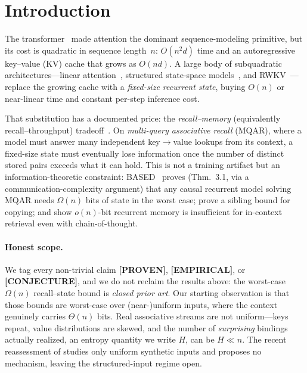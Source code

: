 \section{Introduction}

The transformer~\citep{vaswani2017attention} made attention the dominant sequence-modeling
primitive, but its cost is quadratic in sequence length~$n$: $O(n^2 d)$ time and an
autoregressive key--value (KV) cache that grows as $O(n d)$. A large body of subquadratic
architectures---linear attention~\citep{katharopoulos2020transformers}, structured state-space
models~\citep{gu2022s4,gu2023mamba}, and RWKV~\citep{peng2023rwkv}---replace the growing cache
with a \emph{fixed-size recurrent state}, buying $O(n)$ or near-linear time and constant
per-step inference cost.

That substitution has a documented price: the \emph{recall--memory} (equivalently
recall--throughput) tradeoff~\citep{arora2024zoology,arora2024based}. On
\emph{multi-query associative recall} (MQAR), where a model must answer many independent
key$\rightarrow$value lookups from its context, a fixed-size state must eventually lose
information once the number of distinct stored pairs exceeds what it can hold. This is not a
training artifact but an information-theoretic constraint: BASED~\citep{arora2024based} proves
(Thm.~3.1, via a communication-complexity argument) that any causal recurrent model solving
MQAR needs $\Omega(n)$ bits of state in the worst case; \citet{jelassi2024copying} prove a
sibling bound for copying; and \citet{wen2025rnns} show $o(n)$-bit recurrent memory is
insufficient for in-context retrieval even with chain-of-thought.

\paragraph{Honest scope.}
We tag every non-trivial claim \textbf{[PROVEN]}, \textbf{[EMPIRICAL]}, or
\textbf{[CONJECTURE]}, and we do not reclaim the results above: the worst-case $\Omega(n)$
recall--state bound is \emph{closed prior art}. Our starting observation is that those bounds
are worst-case over (near-)uniform inputs, where the context genuinely carries $\Theta(n)$ bits.
Real associative streams are not uniform---keys repeat, value distributions are skewed, and the
number of \emph{surprising} bindings actually realized, an entropy quantity we write $H$, can be
$H \ll n$. The recent reassessment of \citet{okpekpe2025revisiting} studies only uniform
synthetic inputs and proposes no mechanism, leaving the structured-input regime open.

